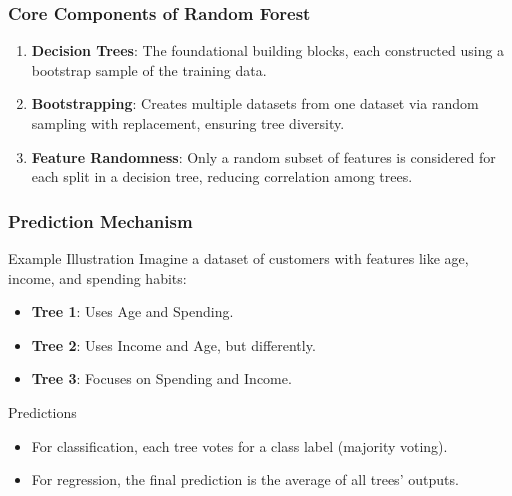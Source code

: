 \documentclass[aspectratio=169]{beamer}
\begin{document}
\begin{frame}[fragile]
    \frametitle{Core Components of Random Forest}
    \begin{enumerate}
        \item \textbf{Decision Trees}: The foundational building blocks, each constructed using a bootstrap sample of the training data.
        \item \textbf{Bootstrapping}: Creates multiple datasets from one dataset via random sampling with replacement, ensuring tree diversity.
        \item \textbf{Feature Randomness}: Only a random subset of features is considered for each split in a decision tree, reducing correlation among trees.
    \end{enumerate}
\end{frame}

\begin{frame}[fragile]
    \frametitle{Prediction Mechanism}
    \begin{block}{Example Illustration}
        Imagine a dataset of customers with features like age, income, and spending habits:
        \begin{itemize}
            \item \textbf{Tree 1}: Uses Age and Spending.
            \item \textbf{Tree 2}: Uses Income and Age, but differently.
            \item \textbf{Tree 3}: Focuses on Spending and Income.
        \end{itemize}
    \end{block}
    
    \begin{block}{Predictions}
        \begin{itemize}
            \item For classification, each tree votes for a class label (majority voting).
            \item For regression, the final prediction is the average of all trees' outputs.
        \end{itemize}
    \end{block}
\end{frame}
\end{document}
